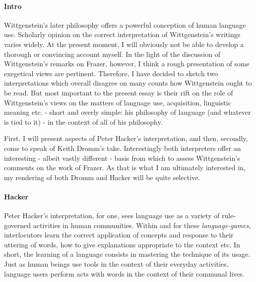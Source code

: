\documentclass{article}
\begin{document}
\paragraph{Intro} Wittgenstein's later philosophy offers a powerful conception of human language use. Scholarly opinion on the correct interpretation of Wittgenstein's writings varies widely. At the present moment, I will obviously not be able to develop a thorough or convincing account myself. In the light of the discussion of Wittgenstein's remarks on Frazer, however, I think a rough presentation of some exegetical views are pertinent. Therefore, I have decided to sketch two interpretations which overall disagree on many counts how Wittgenstein ought to be read. But most important to the present essay is their rift on the role of Wittgenstein's views on the matters of language use, acquisition, linguistic meaning etc. - short and overly simple: his philosophy of language (and whatever is tied to it) - in the context of all of his philosophy.

First, I will present aspects of Peter Hacker's interpretation, and then, secondly, come to speak of Keith Dromm's take. Interestingly both interpreters offer an interesting - albeit vastly different - basis from which to assess Wittgenstein's comments on the work of Frazer. As that is what I am ultimately interested in, my rendering of both Dromm and Hacker will be quite selective.

\paragraph{Hacker} Peter Hacker's interpretation, for one, sees language use as a variety of rule-governed activities in human communities. Within and for these \textit{language-games}, interlocutors learn the correct application of concepts and response to their uttering of words, how to give explanations appropriate to the context etc. In short, the learning of a language consists in mastering the technique of its usage.
Just as human beings use tools in the context of their everyday activities, language users perform acts with words in the context of their communal lives. 
\end{document}
